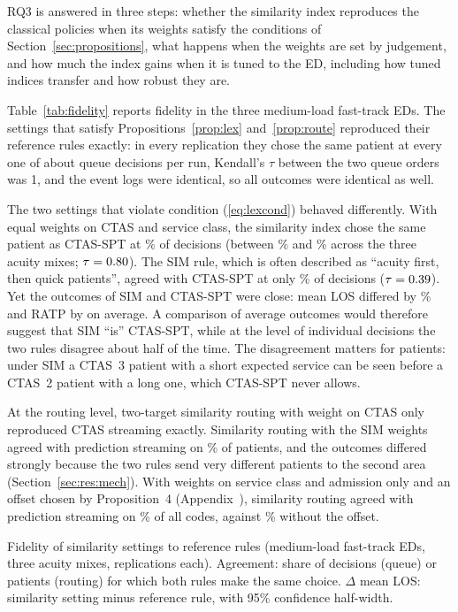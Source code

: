 RQ3 is answered in three steps: whether the similarity index reproduces the classical policies when its weights satisfy the conditions of Section~\ref{sec:propositions}, what happens when the weights are set by judgement, and how much the index gains when it is tuned to the ED, including how tuned indices transfer and how robust they are.


Table~\ref{tab:fidelity} reports fidelity in the three medium-load fast-track EDs. The settings that satisfy Propositions~\ref{prop:lex} and~\ref{prop:route} reproduced their reference rules exactly: in every replication they chose the same patient at every one of about \FidDecisionsPerRun{} queue decisions per run, Kendall's $\tau$ between the two queue orders was 1, and the event logs were identical, so all outcomes were identical as well.

The two settings that violate condition (\ref{eq:lexcond}) behaved differently. With equal weights on CTAS and service class, the similarity index chose the same patient as CTAS-SPT at \FidSimrepNearAgree\% of decisions (between \FidSimrepNearAgreeMin\% and \FidSimrepNearAgreeMax\% across the three acuity mixes; $\tau=0.80$). The SIM rule, which is often described as ``acuity first, then quick patients'', agreed with CTAS-SPT at only \FidSimAgree\% of decisions ($\tau=0.39$). Yet the outcomes of SIM and CTAS-SPT were close: mean LOS differed by \FidSimDLos\% and RATP by \FidSimDRatp{} on average. A comparison of average outcomes would therefore suggest that SIM ``is'' CTAS-SPT, while at the level of individual decisions the two rules disagree about half of the time. The disagreement matters for patients: under SIM a CTAS~3 patient with a short expected service can be seen before a CTAS~2 patient with a long one, which CTAS-SPT never allows.

At the routing level, two-target similarity routing with weight on CTAS only reproduced CTAS streaming exactly. Similarity routing with the SIM weights agreed with prediction streaming on \FidStreamSimAgree\% of patients, and the outcomes differed strongly because the two rules send very different patients to the second area (Section~\ref{sec:res:mech}). With weights on service class and admission only and an offset chosen by Proposition~4 (Appendix~), similarity routing agreed with prediction streaming on \PropFourAgree\% of all \NCodes{} codes, against \PropFourAgreeSimRoute\% without the offset.

\begin{table}[!htbp]
\centering
\caption{Fidelity of similarity settings to reference rules (medium-load fast-track EDs, three acuity mixes, \FidReps{} replications each). Agreement: share of decisions (queue) or patients (routing) for which both rules make the same choice. $\Delta$ mean LOS: similarity setting minus reference rule, with 95\% confidence half-width.}
\label{tab:fidelity}
\footnotesize
\begin{adjustbox}{max width=\linewidth}\end{adjustbox}
\end{table}


